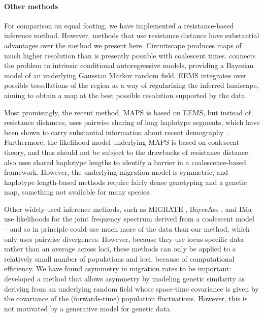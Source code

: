 \documentclass{article}
\begin{document}
\paragraph{Other methods}
For comparison on equal footing, we have implemented a resistance-based inference method.
However, methods that use resistance distance have substantial advantages over the method we present here.
Circuitscape \citep{mcrae2008using} produces maps of much higher resolution 
than is presently possible with coalescent times. 
\citet{hanks2013circuit} connects the problem to intrinsic conditional autoregressive models, 
providing a Bayesian model of an underlying Gaussian Markov random field.
EEMS \citep{petkova2016visualizing} integrates over possible tessellations of the region
as a way of regularizing the inferred landscape,
aiming to obtain a map at the best possible resolution supported by the data.

Most promisingly, the recent method, MAPS \citep[``Migration and Population Surface estimation'',][]{alasadi2018estimating}
is based on EEMS, but instead of resistance distances,
uses pairwise sharing of long haplotype segments,
which have been shown to carry substantial information about recent demography
\citep{ralph2013geography,palamara2013inference,browning2015accurate,ringbauer2017inferring}.
Furthermore, the likelihood model underlying MAPS is based on coalescent theory,
and thus should not be subject to the drawbacks of resistance distance.
\citet{ringbauer2018estimating} also uses shared haplotype lengths
to identify a barrier in a coalescence-based framework.
However, the underlying migration model is symmetric,
and haplotype length-based methods require fairly dense genotyping and a genetic map,
something not available for many species.

Other widely-used inference methods, such as
MIGRATE \citep{beerli1999maximumlikelihood,beerli2010unified},
BayesAss \citep{wilson2003bayesian}, 
and IMa \citep{hey2007integration}
use likelihoods for the joint frequency spectrum derived from a coalescent model --
and so in principle could use much more of the data than our method,
which only uses pairwise divergences.
However, because they use locus-specific data rather than an average across loci,
these methods can only be applied to a relatively small number of populations and loci,
because of computational efficiency.
We have found asymmetry in migration rates to be important:
\citet{hanks2017modeling} developed a method that allows asymmetry
by modeling genetic similarity as deriving from an underlying random field
whose space-time covariance is given by the covariance of the (forwards-time) population fluctuations.
However, this is not motivated by a generative model for genetic data.
\end{document}
